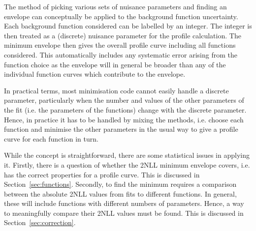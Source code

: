 The method of picking various sets of nuisance parameters and finding
an envelope can conceptually be applied to the background function
uncertainty. Each background function considered can be labelled by an
integer. The integer is then treated as a (discrete) nuisance parameter
for the profile calculation.
The minimum envelope then gives the overall profile curve including
all functions considered. This automatically includes any systematic error
arising from the function choice as the envelope will in general be broader
than any of the individual function curves which contribute to the envelope.

In practical terms, most minimisation
code cannot easily handle a discrete parameter, particularly when the
number and values of the other parameters of the fit (i.e. the parameters
of the functions) change with the discrete parameter.
Hence, in practice it has
to be handled by mixing the methods, i.e. choose each function and minimise
the other parameters in the usual way to give a profile curve for each function
in turn. 

While the concept is straightforward, there are some statistical
issues in applying it.
Firstly, there is a question of whether the 2NLL minimum envelope covers,
i.e. has the correct properties for a profile curve.
This is discussed in Section~\ref{sec:functions}.
Secondly, to find the minimum requires a
comparison between the absolute 2NLL values from fits to different functions.
In general, these will include functions with different numbers of parameters.
Hence, a way to meaningfully compare their 2NLL values must be found.
This is discussed in Section~\ref{sec:correction}.

